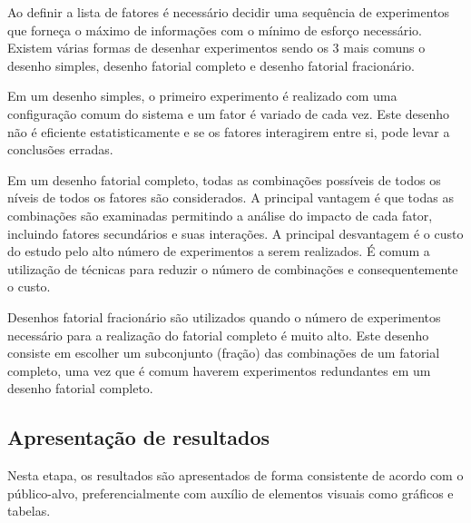 Ao definir a lista de fatores é necessário decidir uma sequência de experimentos que forneça o máximo de informações com o mínimo de esforço necessário. Existem várias formas de desenhar experimentos sendo os 3 mais comuns o desenho simples, desenho fatorial completo e desenho fatorial fracionário.

Em um desenho simples, o primeiro experimento é realizado com uma configuração comum do sistema e um fator é variado de cada vez. Este desenho não é eficiente estatisticamente e se os fatores interagirem entre si, pode levar a conclusões erradas.

Em um desenho fatorial completo, todas as combinações possíveis de todos os níveis de todos os fatores são considerados. A principal vantagem é que todas as combinações são examinadas permitindo a análise do impacto de cada fator, incluindo fatores secundários e suas interações. A principal desvantagem é o custo do estudo pelo alto número de experimentos a serem realizados. É comum a utilização de técnicas para reduzir o número de combinações e consequentemente o custo.

Desenhos fatorial fracionário são utilizados quando o número de experimentos necessário para a realização do fatorial completo é muito alto. Este desenho consiste em escolher um subconjunto (fração) das combinações de um fatorial completo, uma vez que é comum haverem experimentos redundantes em um desenho fatorial completo.

\subsection{Apresentação de resultados}

Nesta etapa, os resultados são apresentados de forma consistente de acordo com o público-alvo, preferencialmente com auxílio de elementos visuais como gráficos e tabelas.